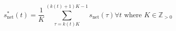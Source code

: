 \begin{equation}
	s^{*}_\text{net}(t) = \frac{1}{K}\sum_{\tau=k(t)K}^{(k(t)+1)K-1}s_\text{net}(\tau) \forall t \text{ where } K \in \mathbb{Z}_{>0}
	\label{ch1:equ:down-sampling-to-half-hourly}
\end{equation}